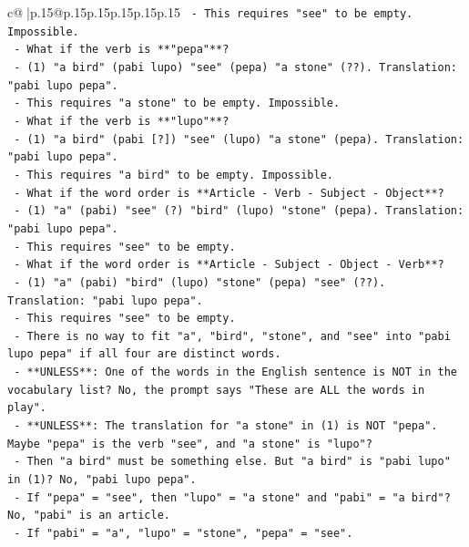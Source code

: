 \documentclass{article}
\begin{document}
{\begin{supertabular}{c@{$\;$}|p{.15\linewidth}@{}p{.15\linewidth}p{.15\linewidth}p{.15\linewidth}p{.15\linewidth}p{.15\linewidth}}
{{{\texttt{          {-} This requires "see" to be empty. Impossible.} \\
\texttt{        {-} What if the verb is **"pepa"**?} \\
\texttt{          {-} (1) "a bird" (pabi lupo) "see" (pepa) "a stone" (??). Translation: "pabi lupo pepa".} \\
\texttt{          {-} This requires "a stone" to be empty. Impossible.} \\
\texttt{        {-} What if the verb is **"lupo"**?} \\
\texttt{          {-} (1) "a bird" (pabi {[}?{]}) "see" (lupo) "a stone" (pepa). Translation: "pabi lupo pepa".} \\
\texttt{          {-} This requires "a bird" to be empty. Impossible.} \\
\texttt{        {-} What if the word order is **Article {-} Verb {-} Subject {-} Object**?} \\
\texttt{          {-} (1) "a" (pabi) "see" (?) "bird" (lupo) "stone" (pepa). Translation: "pabi lupo pepa".} \\
\texttt{          {-} This requires "see" to be empty.} \\
\texttt{        {-} What if the word order is **Article {-} Subject {-} Object {-} Verb**?} \\
\texttt{          {-} (1) "a" (pabi) "bird" (lupo) "stone" (pepa) "see" (??). Translation: "pabi lupo pepa".} \\
\texttt{          {-} This requires "see" to be empty.} \\
\texttt{        {-} There is no way to fit "a", "bird", "stone", and "see" into "pabi lupo pepa" if all four are distinct words.} \\
\texttt{        {-} **UNLESS**: One of the words in the English sentence is NOT in the vocabulary list? No, the prompt says "These are ALL the words in play".} \\
\texttt{        {-} **UNLESS**: The translation for "a stone" in (1) is NOT "pepa". Maybe "pepa" is the verb "see", and "a stone" is "lupo"?} \\
\texttt{          {-} Then "a bird" must be something else. But "a bird" is "pabi lupo" in (1)? No, "pabi lupo pepa".} \\
\texttt{          {-} If "pepa" = "see", then "lupo" = "a stone" and "pabi" = "a bird"? No, "pabi" is an article.} \\
\texttt{          {-} If "pabi" = "a", "lupo" = "stone", "pepa" = "see".} \\
}}}
\end{supertabular}}
\end{document}
